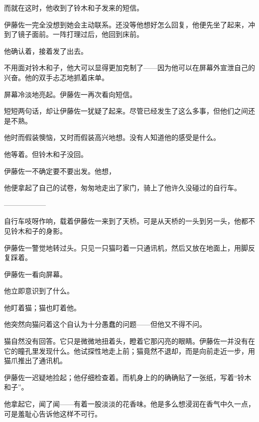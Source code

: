 而就在这时，他收到了铃木和子发来的短信。


伊藤佐一完全没想到她会主动联系。还没等他想好怎么回复，他便先坐了起来，冲到了镜子面前。一阵打理过后，他回到床前。

他确认着，接着发了出去。

不用面对铃木和子，他大可以显得更加克制了——因为他可以在屏幕外宣泄自己的兴奋。他的双手忐忑地抓着床单。


屏幕冷淡地亮起。伊藤佐一再次看向短信。


短短两句话，却让伊藤佐一犹疑了起来。尽管已经发生了这么多事，但他们之间还是不熟。

他时而假装懊恼，又时而假装高兴地想。没有人知道他的感受是什么。


他等着。但铃木和子没回。

伊藤佐一不确定要不要出发。他想，

他便拿起了自己的试卷，匆匆地走出了家门，骑上了他许久没碰过的自行车。

\begin{center}
——————
\end{center}

自行车吱呀作响，载着伊藤佐一来到了天桥。可是从天桥的一头到另一头，他都不见铃木和子的身影。


伊藤佐一警觉地转过头。只见一只猫叼着一只通讯机，然后又放在地面上，用脚反复踩着。


伊藤佐一看向屏幕。


他立即意识到了什么。

他盯着猫；猫也盯着他。

他突然向猫问着这个自认为十分愚蠢的问题——但他又不得不问。

猫自然没有回答。它只是微微地扭着头，瞪着它那闪亮的眼睛。伊藤佐一并没有在它的瞳孔里发现什么。他试探性地走上前；猫竟然不退却，而是向前走近一步，用猫爪推出了通讯机。

伊藤佐一迟疑地捡起；他仔细检查着。而机身上的的确确贴了一张纸，写着“铃木和子”。

他拿起它，闻了闻——有着一股淡淡的花香味。他是多么想浸润在香气中久一点，可是羞耻心告诉他这样不可行。

